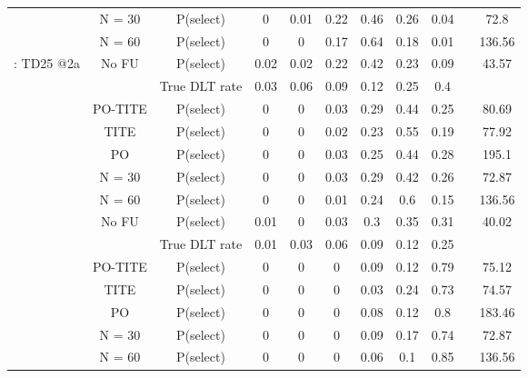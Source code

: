 \begin{table}
\begin{singlespace}
{\begin{tabular}[t]{ccccccccccc}
			& N = 30 & P(select) & 0 & 0.01 & 0.22 & 0.46 & 0.26 & 0.04 &  & 72.8\\
			
			& N = 60 & P(select) & 0 & 0 & 0.17 & 0.64 & 0.18 & 0.01 &  & 136.56\\
			
			\multirow{-7}{*}{\centering\arraybackslash 4: TD25 @2a} & No FU & P(select) & 0.02 & 0.02 & 0.22 & 0.42 & 0.23 & 0.09 &  & 43.57\\
			\cmidrule{1-11}
			\rowcolor{gray!6}   &  & True DLT rate & 0.03 & 0.06 & 0.09 & 0.12 & 0.25 & 0.4 &  & \\
			
			\rowcolor{gray!6}   & PO-TITE & P(select) & 0 & 0 & 0.03 & 0.29 & 0.44 & 0.25 &  & 80.69\\
			
			\rowcolor{gray!6}   & TITE & P(select) & 0 & 0 & 0.02 & 0.23 & 0.55 & 0.19 &  & 77.92\\
			
			\rowcolor{gray!6}   & PO & P(select) & 0 & 0 & 0.03 & 0.25 & 0.44 & 0.28 &  & 195.1\\
			
			\rowcolor{gray!6}   & N = 30 & P(select) & 0 & 0 & 0.03 & 0.29 & 0.42 & 0.26 &  & 72.87\\
			
			\rowcolor{gray!6}   & N = 60 & P(select) & 0 & 0 & 0.01 & 0.24 & 0.6 & 0.15 &  & 136.56\\
			
			\rowcolor{gray!6}  \multirow{-7}{*}{\centering\arraybackslash 5: TD25 @2b} & No FU & P(select) & 0.01 & 0 & 0.03 & 0.3 & 0.35 & 0.31 &  & 40.02\\
			\cmidrule{1-11}
			&  & True DLT rate & 0.01 & 0.03 & 0.06 & 0.09 & 0.12 & 0.25 &  & \\
			
			& PO-TITE & P(select) & 0 & 0 & 0 & 0.09 & 0.12 & 0.79 &  & 75.12\\
			
			& TITE & P(select) & 0 & 0 & 0 & 0.03 & 0.24 & 0.73 &  & 74.57\\
			
			& PO & P(select) & 0 & 0 & 0 & 0.08 & 0.12 & 0.8 &  & 183.46\\
			
			& N = 30 & P(select) & 0 & 0 & 0 & 0.09 & 0.17 & 0.74 &  & 72.87\\
			
			& N = 60 & P(select) & 0 & 0 & 0 & 0.06 & 0.1 & 0.85 &  & 136.56\\
			

\end{tabular}}
\end{singlespace}
\end{table}
